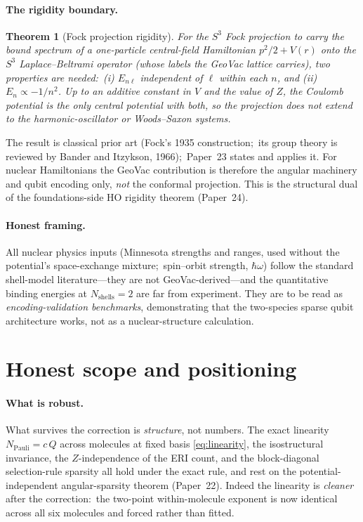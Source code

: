 \documentclass[aps,pra,twocolumn,superscriptaddress,longbibliography]{revtex4-2}
\newtheorem{theorem}{Theorem}
\begin{document}
\paragraph{The rigidity boundary.}
\begin{theorem}[Fock projection rigidity]
For the $S^3$ Fock projection to carry the bound spectrum of a
one-particle central-field Hamiltonian $p^2/2 + V(r)$ onto the $S^3$
Laplace--Beltrami operator (whose labels the GeoVac lattice carries),
two properties are needed:\ (i) $E_{n\ell}$ independent of $\ell$
within each $n$, and (ii) $E_n \propto -1/n^2$.  Up to an additive
constant in $V$ and the value of $Z$, the Coulomb potential is the
only central potential with both, so the projection does not extend
to the harmonic-oscillator or Woods--Saxon systems.
\end{theorem}
The result is classical prior art (Fock's 1935 construction;\ its group
theory is reviewed by Bander and Itzykson, 1966);\ Paper~23 states and
applies it.  For nuclear Hamiltonians the GeoVac contribution is therefore the
angular machinery and qubit encoding only, \emph{not} the conformal
projection.  This is the structural dual of the foundations-side HO
rigidity theorem (Paper~24).

\paragraph{Honest framing.}
All nuclear physics inputs (Minnesota strengths and ranges, used
without the potential's space-exchange mixture;\ spin--orbit strength,
$\hbar\omega$) follow the standard shell-model literature---they are not
GeoVac-derived---and the quantitative binding energies at
$N_{\mathrm{shells}}=2$ are far from experiment.  They are to be read as
\emph{encoding-validation benchmarks}, demonstrating that the two-species
sparse qubit architecture works, not as a nuclear-structure calculation.

\section{Honest scope and positioning}

\paragraph{What is robust.}
What survives the correction is \emph{structure}, not numbers.  The
exact linearity $N_{\mathrm{Pauli}} = c\,Q$ across molecules at fixed
basis \eqref{eq:linearity}, the isostructural invariance, the
$Z$-independence of the ERI count, and the block-diagonal
selection-rule sparsity all hold under the exact rule, and rest on the
potential-independent angular-sparsity theorem (Paper~22).  Indeed the
linearity is \emph{cleaner} after the correction:\ the two-point
within-molecule exponent is now identical across all six molecules and
forced rather than fitted.
\end{document}
